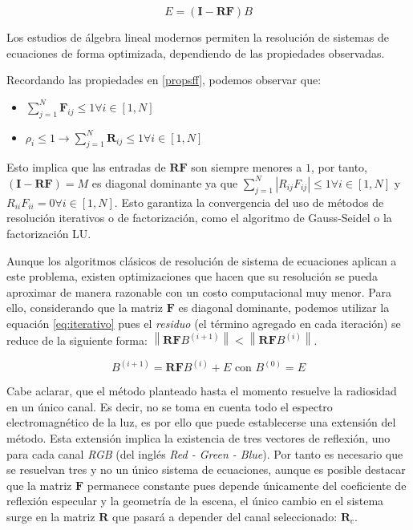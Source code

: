 \begin{equation}
	E = (\mathbf{I} - \mathbf{RF})B
\end{equation}

Los estudios de álgebra lineal modernos permiten la resolución de sistemas de ecuaciones de forma optimizada, dependiendo de las propiedades observadas.

Recordando las propiedades en \ref{propsff}, podemos observar que:

\begin{itemize}
	\item $\sum_{j=1}^{N} \mathbf{F}_{ij} \leq 1 \forall{i \in [1,N]}$
	\item $\rho_{i} \leq 1 \rightarrow \sum_{j=1}^{N} \mathbf{R}_{ij} \leq 1 \forall{i \in [1,N]}$
\end{itemize}

Esto implica que las entradas de $\mathbf{RF}$ s\texttt{}on siempre menores a $1$, por tanto, $(\mathbf{I} - \mathbf{RF}) = M$ es diagonal dominante ya que $\sum_{j=1}^{N}|R_{ij}F_{ij}| \le 1 \forall i \in [1, N]$ y $R_{ii}F_{ii} = 0  \forall  i \in [1,N]$. Esto garantiza la convergencia del uso de métodos de resolución iterativos o de factorización, como el algoritmo de Gauss-Seidel o la factorización LU.

Aunque los algoritmos clásicos de resolución de sistema de ecuaciones aplican a este problema, existen optimizaciones que hacen que su resolución se pueda aproximar de manera razonable con un costo computacional muy menor. Para ello, considerando que la matriz $\mathbf{F}$ es diagonal dominante, podemos utilizar la equación \ref{eq:iterativo} pues el \textit{residuo} (el término agregado en cada iteración) se reduce de la siguiente forma: $\left\|\mathbf{RF}B^{(i+1)}\right\| < \left\|\mathbf{RF}B^{(i)}\right\|$.

\begin{equation}
	B^{(i+1)}  = \mathbf{RF}B^{(i)}  + E \text{ con }  B^{(0)} = E
	\label{eq:iterativo}
\end{equation}

Cabe aclarar, que el método planteado hasta el momento resuelve la radiosidad en un único canal. Es decir, no se toma en cuenta todo el espectro electromagnético de la luz, es por ello que puede establecerse una extensión del método. Esta extensión implica la existencia de tres vectores de reflexión, uno para cada canal \textit{RGB} (del inglés \textit{Red - Green - Blue}). Por tanto es necesario que se resuelvan tres y no un único sistema de ecuaciones, aunque es posible destacar que la matriz $\mathbf{F}$ permanece constante pues depende únicamente del coeficiente de reflexión especular y la geometría de la escena, el único cambio en el sistema surge en la matriz $\mathbf{R}$ que pasará a depender del canal seleccionado: $\mathbf{R}_{c}$.

